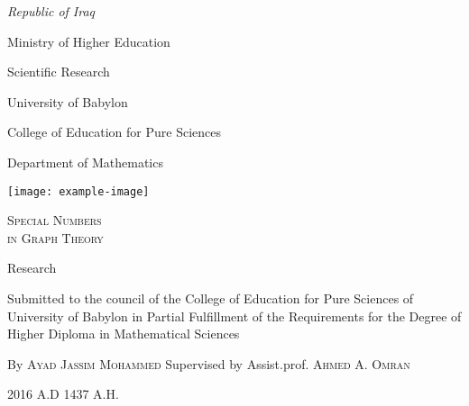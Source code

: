 \documentclass[a4paper,oneside]{article}
\begin{document}
\pagestyle{empty}
\noindent\parbox[c]{.5\linewidth}{
	\linespread{1.3}
	\itshape Republic of Iraq\par
	Ministry of Higher Education\par
	Scientific Research\par
	University of Babylon\par
	College of Education for Pure Sciences\par
	Department of Mathematics\par
}%
\parbox[c]{.5\linewidth}{
	\hfill\texttt{[image: example-image]}
}

\centering

\par\vspace{.15\textheight}

{\huge\textsc{Special Numbers \\ in Graph Theory}\par}
\Large

\par\vspace{.1\textheight}
Research

\medbreak
Submitted to the council of the College of Education for Pure Sciences of University of Babylon in Partial Fulfillment of the Requirements for the Degree of Higher Diploma in Mathematical Sciences
\par\vspace{.08\textheight}
By
\medbreak
\textsc{Ayad Jassim Mohammed}
\bigbreak
Supervised by
\medbreak
Assist.prof. \textsc{Ahmed A. Omran}

\vfill

\noindent%
\small 2016 A.D \hfill 1437 A.H. 
\end{document}
